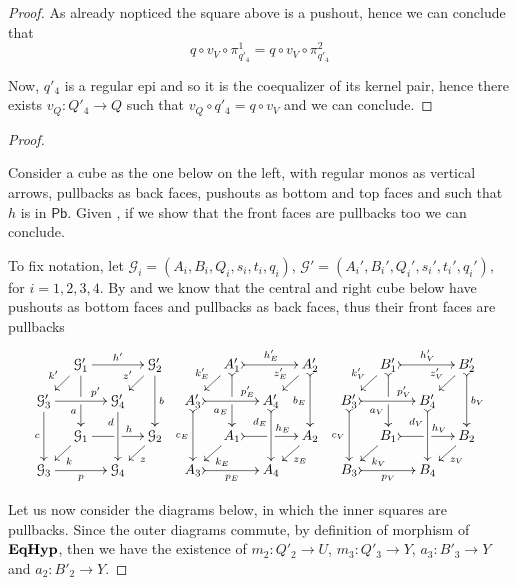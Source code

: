 \documentclass[a4paper,UKenglish,cleveref,pdftex,thm-restate,numberwithinsect]{lipics-v2021}
\newcommand{\pbc}{\mathsf{Pb}}
\newcommand{\catname}[1]{\textbf{\textup{#1}}}
\newcommand{\EqHyp}{\catname{EqHyp}} %
\begin{document}
\begin{proof}
As already nopticed the square above is a pushout, hence we can conclude that
\[
q \circ v_V \circ \pi_{q'_4}^1 = q \circ v_V \circ \pi_{q'_4}^2
\]

Now, $q'_4$ is a regular epi and so it is the coequalizer of its kernel pair, hence there exists $v_Q\colon Q'_4\to Q$ such that $v_Q\circ q'_4=q\circ v_V$ and we can conclude.
\end{proof}

\pbvk*

\begin{proof}\label{proof:pbvk}
	
Consider a cube as the one below on the left, with regular monos as vertical arrows, pullbacks as back faces, pushouts as bottom and top faces and such that $h$ is in $\pbc$.
Given , if we show that the front faces are pullbacks too we can conclude.

To fix notation, let $\mathcal{G}_i = (A_i, B_i, Q_i, s_i, t_i, q_i)$, $\mathcal{G}'=(A_i', B_i', Q_i', s_i', t_i', q_i')$, for $i = 1, 2, 3, 4$. By  and  we know that the central and right cube below have pushouts as bottom faces and pullbacks as back faces,
	thus their front faces are pullbacks
	\[
	\xymatrix@C=10pt@R=10pt{&\mathcal{G}_1'\ar[dd]|\hole_(.65){a}\ar[rr]^{h'} \ar[dl]_{k'} && \mathcal{G}_2' \ar[dd]^{b} \ar[dl]_{z'} & &A_1'\ar@{>->}[dd]|\hole_(.65){a_E}\ar@{>->}[rr]^{h_E'} \ar[dl]_{k_E'} && A_2' \ar@{>->}[dd]_{b_E} \ar[dl]_{z_E'} &&B_1'\ar@{>->}[dd]|\hole_(.65){a_V}\ar@{>->}[rr]^{h_V'} \ar[dl]_{k_V'} && B_2' \ar@{>->}[dd]^{b_V} \ar[dl]_{z_V'} \\ 
		\mathcal{G}_3'  \ar[dd]_{c}\ar[rr]^(.7){p'} & & \mathcal{G}_4' \ar[dd]_(.3){d} &&A_3'  \ar@{>->}[dd]_{c_E}\ar@{>->}[rr]^(.7){p_E'} & & A_4' \ar@{>->}[dd]_(.3){d_E}
		&&B_3'  \ar@{>->}[dd]_{c_V}\ar@{>->}[rr]^(.7){p_V'} & & B_4' \ar@{>->}[dd]_(.3){d_V}\\
		&\mathcal{G}_1\ar[rr]|\hole^(.65){h} \ar[dl]^{k} && \mathcal{G}_2 \ar[dl]^{z} & &A_1\ar@{>->}[rr]|\hole^(.65){h_E} \ar[dl]^{k_E} && A_2 \ar[dl]^{z_E} &&B_1\ar@{>->}[rr]|\hole^(.65){h_V} \ar[dl]^{k_V} && B_2 \ar[dl]^{z_V} \\
		\mathcal{G}_3 \ar[rr]_{p} & & \mathcal{G}_4 && A_3 \ar@{>->}[rr]_{p_E} & & A_4&&B_3 \ar@{>->}[rr]_{p_V} & & B_4 }
	\]


Let us now consider the diagrams below, in which the inner squares are pullbacks.	Since the outer diagrams commute, by definition of morphism of $\EqHyp$, then we have the existence of $m_2\colon Q'_2\to U$, $m_3\colon Q'_3\to Y $, $a_3\colon B'_3\to Y$ and $a_2\colon B'_2\to Y$.


\end{proof}
\end{document}
